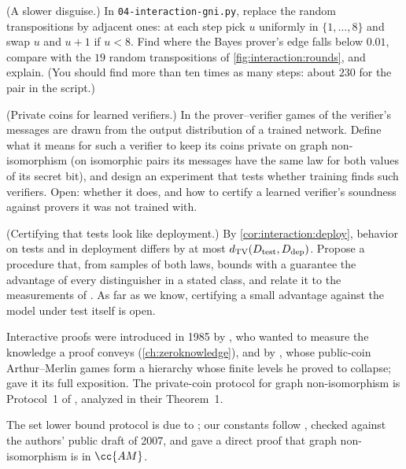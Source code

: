\begin{refsection}
\begin{exercises}
\item \simulation (A slower disguise.) In \texttt{04-interaction-gni.py}, replace the random transpositions by adjacent ones: at each step pick $u$ uniformly in $\{1,\dots,8\}$ and swap $u$ and $u+1$ if $u<8$. Find where the Bayes prover's edge falls below $0.01$, compare with the $19$ random transpositions of \cref{fig:interaction:rounds}, and explain. (You should find more than ten times as many steps: about $230$ for the pair in the script.)\label{ex:interaction:adjacent}

\item \research (Private coins for learned verifiers.) In the prover--verifier games of \textcite{HammondAdamDay2025} the verifier's messages are drawn from the output distribution of a trained network. Define what it means for such a verifier to keep its coins private on graph non-isomorphism (on isomorphic pairs its messages have the same law for both values of its secret bit), and design an experiment that tests whether training finds such verifiers. Open: whether it does, and how to certify a learned verifier's soundness against provers it was not trained with.\label{ex:interaction:learned}

\item \research (Certifying that tests look like deployment.) By \cref{cor:interaction:deploy}, behavior on tests and in deployment differs by at most $d_{\mathrm{TV}}(D_{\mathrm{test}},D_{\mathrm{dep}})$. Propose a procedure that, from samples of both laws, bounds with a guarantee the advantage of every distinguisher in a stated class, and relate it to the measurements of \textcite{NeedhamEtAl2025}. As far as we know, certifying a small advantage against the model under test itself is open.\label{ex:interaction:certify}
\end{exercises}

\notesandrefs
Interactive proofs were introduced in 1985 by \textcite{GoldwasserMicaliRackoff1989}, who wanted to measure the knowledge a proof conveys (\cref{ch:zeroknowledge}), and by \textcite{Babai1985}, whose public-coin Arthur--Merlin games form a hierarchy whose finite levels he proved to collapse; \textcite{BabaiMoran1988} gave it its full exposition. The private-coin protocol for graph non-isomorphism is Protocol~1 of \textcite{GoldreichMicaliWigderson1991}, analyzed in their Theorem~1.

The set lower bound protocol is due to \textcite{GoldwasserSipser1986}; our constants follow \textcite[Chapter~8]{AroraBarak2009}, checked against the authors' public draft of 2007, and \textcite{BabaiMoran1988} gave a direct proof that graph non-isomorphism is in $\cc{AM}$.


\end{refsection}
